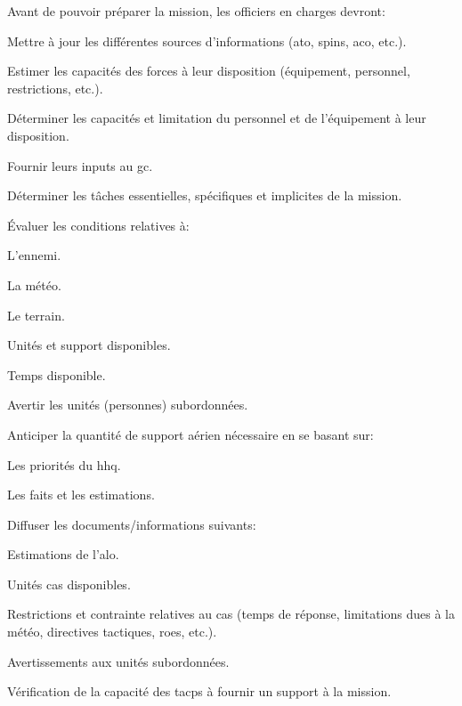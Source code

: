 \begin{e1}
	\item Avant de pouvoir préparer la mission, les officiers en charges devront:
	\begin{e2}
		\item Mettre à jour les différentes sources d'informations (\gls{ato}, \gls{spins}, \gls{aco}, etc.).
		\item Estimer les capacités des forces à leur disposition (équipement, personnel, restrictions, etc.).
		\item Déterminer les capacités et limitation du personnel et de l'équipement à leur disposition.
		\item Fournir leurs inputs au \gls{gc}.
		\item Déterminer les tâches essentielles, spécifiques et implicites de la mission.
		\item Évaluer les conditions relatives à:
		\begin{e3}
			\item L'ennemi.
			\item La météo.
			\item Le terrain.
			\item Unités et support disponibles.
			\item Temps disponible.
		\end{e3}
		\item Avertir les unités (personnes) subordonnées.
		\item Anticiper la quantité de support aérien nécessaire en se basant sur:
		\begin{e3}
			\item Les priorités du \gls{hhq}.
			\item Les faits et les estimations.
		\end{e3}
		\item Diffuser les documents/informations suivants:
		\begin{e3}
			\item Estimations de l'\gls{alo}.
			\item Unités \gls{cas} disponibles.
			\item Restrictions et contrainte relatives au \gls{cas} (temps de réponse, limitations dues à la météo, directives tactiques, \glspl{roe}, etc.).
			\item Avertissements aux unités subordonnées.
			\item Vérification de la capacité des \glspl{tacp} à fournir un support à la mission.
		\end{e3}
	\end{e2}
	

\end{e1}
